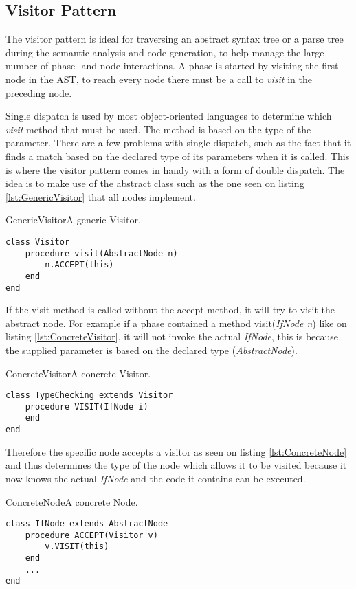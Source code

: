 \subsection{Visitor Pattern}
\label{sec:VisitorPattern}
The visitor pattern is ideal for traversing an abstract syntax tree or a parse tree during the semantic analysis and code generation, to help manage the large number of phase- and node interactions. A phase is started by visiting the first node in the AST, to reach every node there must be a call to \emph{visit} in the preceding node.

Single dispatch is used by most object-oriented languages to determine which \emph{visit} method that must be used. The method is based on the type of the parameter. There are a few problems with single dispatch, such as the fact that it finds a match based on the declared type of its parameters when it is called. This is where the visitor pattern comes in handy with a form of double dispatch. The idea is to make use of the abstract class such as the one seen on listing \ref{lst:GenericVisitor} that all nodes implement.

\begin{code}{GenericVisitor}{A generic Visitor.}
\begin{lstlisting}
class Visitor
	procedure visit(AbstractNode n)
		n.ACCEPT(this)
	end
end
\end{lstlisting}
\end{code}

If the visit method is called without the accept method, it will try to visit the abstract node. For example if a phase contained a method visit(\textit{IfNode n}) like on listing \ref{lst:ConcreteVisitor}, it will not invoke the actual \textit{IfNode}, this is because the supplied parameter is based on the declared type (\textit{AbstractNode}).

\begin{code}{ConcreteVisitor}{A concrete Visitor.}
\begin{lstlisting}
class TypeChecking extends Visitor
	procedure VISIT(IfNode i)
	end
end
\end{lstlisting}
\end{code}

Therefore the specific node accepts a visitor as seen on listing \ref{lst:ConcreteNode} and thus determines the type of the node which allows it to be visited because it now knows the actual \textit{IfNode} and the code it contains can be executed.

\begin{code}{ConcreteNode}{A concrete Node.}
\begin{lstlisting}
class IfNode extends AbstractNode
	procedure ACCEPT(Visitor v)
		v.VISIT(this)
	end
	...
end
\end{lstlisting}
\end{code}